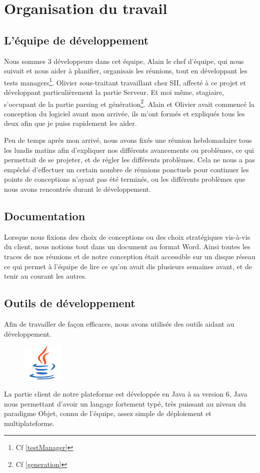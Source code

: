 \chapter{Organisation du travail}
\section{L'équipe de développement}
Nous sommes 3 développeurs dans cet équipe, Alain  le chef d'équipe, qui nous suivait et nous aider à planifier, organisais les réunions, tout en développant les tests managers\footnote{Cf \ref{testManager}}. Olivier  sous-traitant travaillant chez SII, affecté à ce projet et développant particulièrement la partie Serveur. Et moi même, stagiaire, s'occupant de la partie parsing et génération\footnote{Cf \ref{generation}}. Alain et Olivier avait commencé la conception du logiciel avant mon arrivée, ils m'ont formés et expliqués tous les deux afin que je puiss rapidement les aider.

Peu de temps après mon arrivé, nous avons fixés une réunion hebdomadaire tous les lundis matins afin d'expliquer nos différents avancements ou problèmes, ce qui permettait de se projeter, et de régler les différents problèmes. Cela ne nous a pas empêché d'effectuer un certain nombre de réunions ponctuels pour continuer les points de conceptions n'ayant pas été terminés, ou les différents problèmes que nous avons rencontrés durant le développement.

\section{Documentation}
Lorsque nous fixions des choix de conceptions ou des choix stratégiques vis-à-vis du client, nous notions tout dans un document au format Word. Ainsi toutes les traces de nos réunions et de notre conception était accessible sur un disque réseau ce qui permet à l'équipe de lire ce qu'on avait dis plusieurs semaines avant, et de tenir au courant les autres.

\section{Outils de développement}
Afin de travailler de façon efficaces, nous avons utilisés des outils aidant au développement.

\begin{figure}
	\includegraphics[width=2cm]{contents/images/logoJava.png}
\end{figure}
La partie client de notre plateforme est développée en Java à sa version 6, Java nous permettant d'avoir un langage fortement typé, très puissant au niveau du paradigme Objet, connu de l'équipe, assez simple de déploiement et multiplateforme. 

